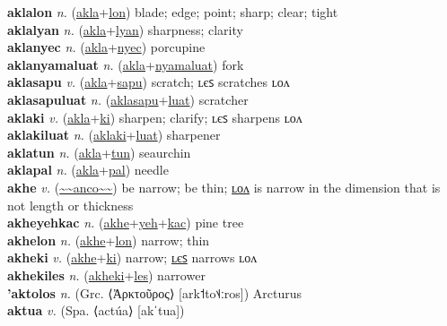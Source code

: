 \textbf{aklalon} \textit{n.} (\hyperref[akla]{akla}+\hyperref[lon]{lon})
blade; edge; point; sharp; clear; tight \label{aklalon} \\
\textbf{aklalyan} \textit{n.} (\hyperref[akla]{akla}+\hyperref[lyan]{lyan})
sharpness; clarity \label{aklalyan} \\
\textbf{aklanyec} \textit{n.} (\hyperref[akla]{akla}+\hyperref[nyec]{nyec})
porcupine \label{aklanyec} \\
\textbf{aklanyamaluat} \textit{n.} (\hyperref[akla]{akla}+\hyperref[nyamaluat]{nyamaluat})
fork \label{aklanyamaluat} \\
\textbf{aklasapu} \textit{v.} (\hyperref[akla]{akla}+\hyperref[sapu]{sapu})
scratch; ʟєꜱ scratches ʟᴏᴧ \label{aklasapu} \\
\textbf{aklasapuluat} \textit{n.} (\hyperref[aklasapu]{aklasapu}+\hyperref[luat]{luat})
scratcher \label{aklasapuluat} \\
\textbf{aklaki} \textit{v.} (\hyperref[akla]{akla}+\hyperref[ki]{ki})
sharpen; clarify; ʟєꜱ sharpens ʟᴏᴧ \label{aklaki} \\
\textbf{aklakiluat} \textit{n.} (\hyperref[aklaki]{aklaki}+\hyperref[luat]{luat})
sharpener \label{aklakiluat} \\
\textbf{aklatun} \textit{n.} (\hyperref[akla]{akla}+\hyperref[tun]{tun})
seaurchin \label{aklatun} \\
\textbf{aklapal} \textit{n.} (\hyperref[akla]{akla}+\hyperref[pal]{pal})
needle \label{aklapal} \\
\textbf{akhe} \textit{v.} (\hyperref[anco]{\~{}\~{}anco\~{}\~{}})
be narrow; be thin; \hyperref[akhelon]{ʟᴏᴧ} is narrow in the dimension that is not length or thickness \label{akhe} \\
\textbf{akheyehkac} \textit{n.} (\hyperref[akhe]{akhe}+\hyperref[yeh]{yeh}+\hyperref[kac]{kac})
pine tree \label{akheyehkac} \\
\textbf{akhelon} \textit{n.} (\hyperref[akhe]{akhe}+\hyperref[lon]{lon})
narrow; thin \label{akhelon} \\
\textbf{akheki} \textit{v.} (\hyperref[akhe]{akhe}+\hyperref[ki]{ki})
narrow; \hyperref[akhekiles]{ʟєꜱ} narrows ʟᴏᴧ \label{akheki} \\
\textbf{akhekiles} \textit{n.} (\hyperref[akheki]{akheki}+\hyperref[les]{les})
narrower \label{akhekiles} \\
\textbf{'aktolos} \textit{n.} (Grc. ⟨Ἀρκτοῦρος⟩ [ark˦to˦˨ːros])
Arcturus \label{'aktolos} \\
\textbf{aktua} \textit{v.} (Spa. ⟨actúa⟩ [akˈtua])
